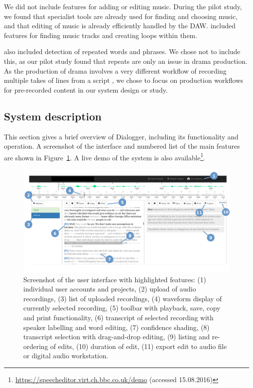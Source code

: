We did not include features for adding or editing music. During the pilot study,
we found that specialist tools are already used for finding and choosing music,
and that editing of music is already efficiently handled by the DAW.
\citet{Rubin2013} included features for finding music tracks and creating loops
within them.

\citet{Rubin2013} also included detection of repeated words and phrases. We chose not to include this, as our pilot
study found that repeats are only an issue in drama production. As the production of drama involves a very different
workflow of recording multiple takes of lines from a script \citep{Baume2015}, we chose to focus on production
workflows for pre-recorded content in our system design or study.


\subsection{System description}
This section gives a brief overview of Dialogger, including its functionality
and operation.  A screenshot of the interface and numbered list of the main
features are shown in Figure~\ref{fig:interface}.  A live demo of the system
is also available\footnote{\url{https://speecheditor.virt.ch.bbc.co.uk/demo}
  (accessed 15.08.2016)}.

\begin{figure}[ht]
\centering
  \includegraphics[width=\columnwidth]{figs/interface-labels.pdf}
  \caption{Screenshot of the user interface with highlighted features: (1)
    individual user accounts and projects, (2) upload of audio recordings, (3)
    list of uploaded recordings, (4) waveform display of currently selected
    recording, (5) toolbar with playback, save, copy and print functionality,
    (6) transcript of selected recording with speaker labelling and word
    editing, (7) confidence shading, (8) transcript selection with
    drag-and-drop editing, (9) listing and re-ordering of edits, (10) duration
    of edit, (11) export edit to audio file or digital audio workstation.}
  \label{fig:interface}
\end{figure}

